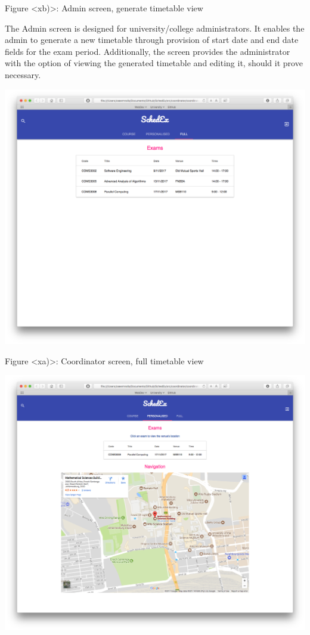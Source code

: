 \documentclass{article}
\begin{document}
Figure <xb)>: Admin screen, generate timetable view 

The Admin screen is designed for university/college administrators. It enables the admin to generate a new timetable through provision of start date and end date fields for the exam period. Additionally, the screen provides the administrator with the option of viewing the generated timetable and editing it, should it prove necessary. 

\centerline{\includegraphics[scale=0.4]{coordinator_full}}

Figure <xa)>: Coordinator screen, full timetable view

\centerline{\includegraphics[scale=0.4]{coordinator_personalised}}
\end{document}

